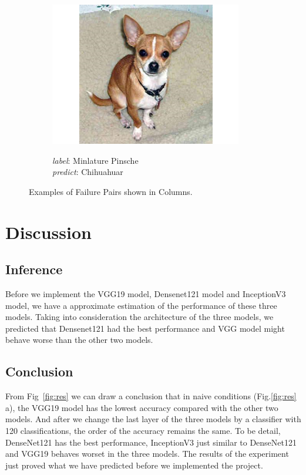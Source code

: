 \documentclass{article}
\begin{document}
\begin{figure}
\begin{subfigure}{0.32\linewidth}
		\includegraphics[width=\linewidth]{pics/s2}
		\caption{}
		\emph{label}:  Minlature Pinsche \\  \emph{predict}: Chihuahuar
		\label{fig:s2}
	\end{subfigure} 
	
	\caption{Examples of Failure Pairs shown in Columns.}
\end{figure}


\newpage
\section{Discussion}

\subsection{Inference}
Before we implement the VGG19 model, Densenet121 model and InceptionV3 model, we have a approximate estimation of the performance of these three models. Taking into consideration the architecture of the three models, we predicted that Densenet121 had the best performance and VGG model might behave worse than the other two models. 
\subsection{Conclusion}
From Fig~\ref{fig:res} we can draw a conclusion that in naive conditions (Fig.\ref{fig:res} a), the VGG19 model has the lowest accuracy compared with the other two models. And after we change the last layer of the three models by a classifier with 120 classifications, the order of the accuracy remains the same. To be detail, DenseNet121 has the best performance, InceptionV3 just similar to DenseNet121 and VGG19 behaves worset in the three models. The results of the experiment just proved what we have predicted before we implemented the project.
\end{document}

